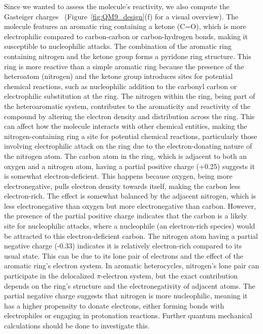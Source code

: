 \documentclass{article}
\begin{document}
Since we wanted to assess the molecule's reactivity, we also compute the Gasteiger charges~\cite{Gasteiger1980IterativeCharges} (Figure~\ref{fig:QM9_design}(f) for a visual overview). The molecule features an aromatic ring containing a ketone (C=O), which is more electrophilic compared to carbon-carbon or carbon-hydrogen bonds, making it susceptible to nucleophilic attacks. The combination of the aromatic ring containing nitrogen and the ketone group forms a pyridone ring structure. This ring is more reactive than a simple aromatic ring because the presence of the heteroatom (nitrogen) and the ketone group introduces sites for potential chemical reactions, such as nucleophilic addition to the carbonyl carbon or electrophilic substitution at the ring. The nitrogen within the ring, being part of the heteroaromatic system, contributes to the aromaticity and reactivity of the compound by altering the electron density and distribution across the ring. This can affect how the molecule interacts with other chemical entities, making the nitrogen-containing ring a site for potential chemical reactions, particularly those involving electrophilic attack on the ring due to the electron-donating nature of the nitrogen atom.
%
The carbon atom in the ring, which is adjacent to both an oxygen and a nitrogen atom, having a partial positive charge (+0.25) suggests it is somewhat electron-deficient. This happens because oxygen, being more electronegative, pulls electron density towards itself, making the carbon less electron-rich. The effect is somewhat balanced by the adjacent nitrogen, which is less electronegative than oxygen but more electronegative than carbon. However, the presence of the partial positive charge indicates that the carbon is a likely site for nucleophilic attacks, where a nucleophile (an electron-rich species) would be attracted to this electron-deficient carbon.
%
The nitrogen atom having a partial negative charge (-0.33) indicates it is relatively electron-rich compared to its usual state. This can be due to its lone pair of electrons and the effect of the aromatic ring's electron system. In aromatic heterocycles, nitrogen's lone pair can participate in the delocalized $\pi$-electron system, but the exact contribution depends on the ring's structure and the electronegativity of adjacent atoms. The partial negative charge suggests that nitrogen is more nucleophilic, meaning it has a higher propensity to donate electrons, either forming bonds with electrophiles or engaging in protonation reactions. Further quantum mechanical calculations should be done to investigate this.
\end{document}
